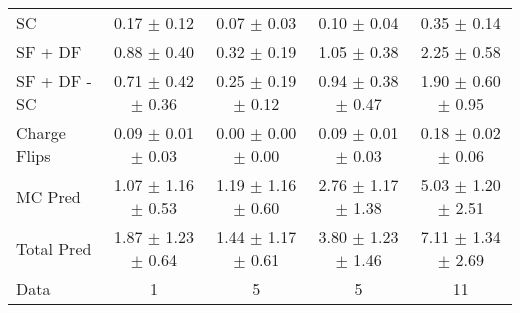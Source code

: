 \begin{tabular}{l|cccc}
                                 SC &  0.17 $\pm$  0.12 &  0.07 $\pm$  0.03 &  0.10 $\pm$  0.04 &  0.35 $\pm$  0.14 \\
                            SF + DF &  0.88 $\pm$  0.40 &  0.32 $\pm$  0.19 &  1.05 $\pm$  0.38 &  2.25 $\pm$  0.58 \\
\hline
                       SF + DF - SC &  0.71 $\pm$  0.42 $\pm$  0.36 &  0.25 $\pm$  0.19 $\pm$  0.12 &  0.94 $\pm$  0.38 $\pm$  0.47 &  1.90 $\pm$  0.60 $\pm$  0.95 \\
\hline\hline
                       Charge Flips &  0.09 $\pm$  0.01 $\pm$  0.03 &  0.00 $\pm$  0.00 $\pm$  0.00 &  0.09 $\pm$  0.01 $\pm$  0.03 &  0.18 $\pm$  0.02 $\pm$  0.06 \\
\hline
                            MC Pred &  1.07 $\pm$  1.16 $\pm$  0.53 &  1.19 $\pm$  1.16 $\pm$  0.60 &  2.76 $\pm$  1.17 $\pm$  1.38 &  5.03 $\pm$  1.20 $\pm$  2.51 \\
\hline
                         Total Pred &  1.87 $\pm$  1.23 $\pm$  0.64 &  1.44 $\pm$  1.17 $\pm$  0.61 &  3.80 $\pm$  1.23 $\pm$  1.46 &  7.11 $\pm$  1.34 $\pm$  2.69 \\
\hline\hline
                               Data &     1 &     5 &     5 &    11 \\
\hline\hline
\end{tabular}

